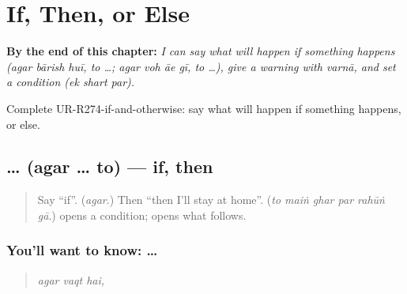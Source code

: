 
\chapter{If, Then, or Else}
\label{ch:ur-if-then-or-else}

\begin{chapteropening}
\textbf{By the end of this chapter:} \emph{I can say what will happen if something happens (agar bārish huī, to …; agar voh āe gī, to …), give a warning with varnā, and set a condition (ek shart par).}

Complete UR-R274-if-and-otherwise: say what will happen if something happens, or else.
\end{chapteropening}

\section[\texorpdfstring{\ur{اگر} … \ur{تو} (agar … to)}{اگر … تو (agar … to)}]{ …  (agar … to) — if, then}

\label{lesson:UR-C274-agar-to}



\begin{quote}
Say \textquotedblleft{}if\textquotedblright{}. (\emph{agar}.) Then \textquotedblleft{}then I'll stay at home\textquotedblright{}. (\emph{to maiṅ ghar par rahūṅ gā}.) \textbf{} opens a condition; \textbf{} opens what follows.
\end{quote}

\subsection*{You'll want to know:  … }
\begin{quote}
\textbf{  }
\end{quote}

\begin{quote}
\emph{agar vaqt hai,}
\end{quote}

\begin{quote}
\textbf{ }
\end{quote}

